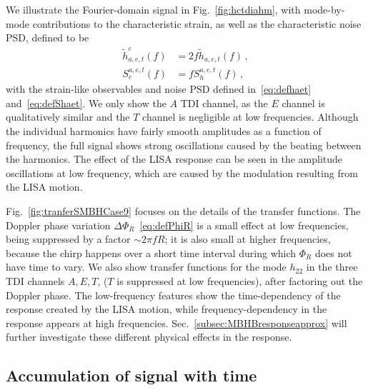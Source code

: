 \documentclass[aps,showpacs,twocolumn,prd,superscriptaddress,nofootinbib]{revtex4-1}
\newcommand{\bsub}{\begin{subequations}}
\newcommand{\esub}{\end{subequations}}
\begin{document}
We illustrate the Fourier-domain signal in Fig.~\ref{fig:hctdiahm}, with mode-by-mode contributions to the characteristic strain, as well as the characteristic noise PSD, defined to be
\bsub\label{eq:defhc}
\begin{align}
	\tilde{h}_{a,e,t}^{c} (f) &= 2 f \tilde{h}_{a,e,t} (f) \,,\\
	S^{a,e,t}_{c} (f) &= f S^{a,e,t}_{h} (f) \,,
\end{align}
\esub
with the strain-like observables and noise PSD defined in~\eqref{eq:defhaet} and~\eqref{eq:defShaet}.
We only show the $A$ TDI channel, as the $E$ channel is qualitatively similar and the $T$ channel is negligible at low frequencies.
Although the individual harmonics have fairly smooth amplitudes as a function of frequency, the full signal shows strong oscillations caused by the beating between the harmonics.
The effect of the LISA response can be seen in the amplitude oscillations at low frequency, which are caused by the modulation resulting from the LISA motion.

Fig.~\ref{fig:tranferSMBHCase9} focuses on the details of the transfer functions.
The Doppler phase variation $\Delta \Phi_{R}$~\eqref{eq:defPhiR} is a small effect at low frequencies, being suppressed by a factor $\sim 2\pi f R$; it is also small at higher frequencies, because the chirp happens over a short time interval during which $\Phi_{R}$ does not have time to vary. We also show transfer functions for the mode $h_{22}$ in the three TDI channels $A,E,T$, ($T$ is suppressed at low frequencies), after factoring out the Doppler phase. The low-frequency features show the time-dependency of the response created by the LISA motion, while frequency-dependency in the response appears at high frequencies.
Sec.~\ref{subsec:MBHBresponseapprox} will further investigate these different physical effects in the response.


\subsection{Accumulation of signal with time}
\label{subsec:MBHBacctime}
\end{document}
